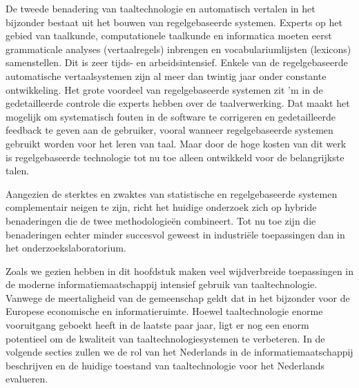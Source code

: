 \documentclass[]{../../metanetpaper}
\begin{document}
\begin{multicols}{2}
    De tweede benadering van taaltechnologie en automatisch vertalen in het bijzonder bestaat uit het bouwen van regelgebaseerde systemen. Experts op het gebied van taalkunde, computationele taalkunde en informatica moeten eerst grammaticale analyses (vertaalregels) inbrengen en vocabulariumlijsten (lexicons) samenstellen. Dit is zeer tijds- en arbeidsintensief. Enkele van de regelgebaseerde automatische vertaalsystemen zijn al meer dan twintig jaar onder constante ontwikkeling. Het grote voordeel van regelgebaseerde systemen zit 'm in de gedetailleerde controle die experts hebben over de taalverwerking. Dat maakt het mogelijk om systematisch fouten in de software te corrigeren en gedetailleerde feedback te geven aan de gebruiker, vooral wanneer regelgebaseerde systemen gebruikt worden voor het leren van taal. Maar door de hoge kosten van dit werk is regelgebaseerde technologie tot nu toe alleen ontwikkeld voor de belangrijkste talen.

    Aangezien de sterktes en zwaktes van statistische en regelgebaseerde systemen complementair neigen te zijn, richt het huidige onderzoek zich op hybride benaderingen die de twee methodologie{\"e}n combineert. Tot nu toe zijn die benaderingen echter minder succesvol geweest in industri{\"e}le toepassingen dan in het onderzoekslaboratorium.

    Zoals we gezien hebben in dit hoofdstuk maken veel wijdverbreide toepassingen in de moderne informatiemaatschappij intensief gebruik van taaltechnologie. Vanwege de meertaligheid van de gemeenschap geldt dat in het bijzonder voor de Europese economische en informatieruimte. Hoewel taaltechnologie enorme vooruitgang geboekt heeft in de laatste paar jaar, ligt er nog een enorm potentieel om de kwaliteit van taaltechnologiesystemen te verbeteren. In de volgende secties zullen we de rol van het Nederlands in de informatiemaatschappij beschrijven en de huidige toestand van taaltechnologie voor het Nederlands evalueren.
 
\end{multicols}

\clearpage


\end{document}
